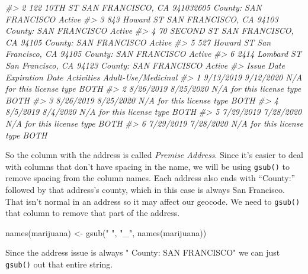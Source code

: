\documentclass[
  12pt,
]{book}
\newenvironment{Shaded}{\begin{snugshade}}{\end{snugshade}}
\newcommand{\CommentTok}[1]{\textcolor[rgb]{0.37,0.37,0.37}{\textit{#1}}}
\newcommand{\FunctionTok}[1]{\textcolor[rgb]{0,0,0}{#1}}
\newcommand{\NormalTok}[1]{#1}
\newcommand{\OtherTok}[1]{\textcolor[rgb]{0.37,0.37,0.37}{#1}}
\newcommand{\SpecialCharTok}[1]{\textcolor[rgb]{0,0,0}{#1}}
\newcommand{\StringTok}[1]{\textcolor[rgb]{0.5,0.5,0.5}{#1}}
\begin{document}
\begin{Shaded}
\begin{Highlighting}[]
\CommentTok{\#\textgreater{} 2 122 10TH ST SAN FRANCISCO, CA 941032605 County: SAN FRANCISCO Active}
\CommentTok{\#\textgreater{} 3   843 Howard ST SAN FRANCISCO, CA 94103 County: SAN FRANCISCO Active}
\CommentTok{\#\textgreater{} 4    70 SECOND ST SAN FRANCISCO, CA 94105 County: SAN FRANCISCO Active}
\CommentTok{\#\textgreater{} 5   527 Howard ST San Francisco, CA 94105 County: SAN FRANCISCO Active}
\CommentTok{\#\textgreater{} 6 2414 Lombard ST San Francisco, CA 94123 County: SAN FRANCISCO Active}
\CommentTok{\#\textgreater{}   Issue Date Expiration Date                Activities Adult{-}Use/Medicinal}
\CommentTok{\#\textgreater{} 1  9/13/2019       9/12/2020 N/A for this license type                BOTH}
\CommentTok{\#\textgreater{} 2  8/26/2019       8/25/2020 N/A for this license type                BOTH}
\CommentTok{\#\textgreater{} 3  8/26/2019       8/25/2020 N/A for this license type                BOTH}
\CommentTok{\#\textgreater{} 4   8/5/2019        8/4/2020 N/A for this license type                BOTH}
\CommentTok{\#\textgreater{} 5  7/29/2019       7/28/2020 N/A for this license type                BOTH}
\CommentTok{\#\textgreater{} 6  7/29/2019       7/28/2020 N/A for this license type                BOTH}
\end{Highlighting}
\end{Shaded}

So the column with the address is called \emph{Premise Address}. Since it's easier to deal with columns that don't have spacing in the name, we will be using \texttt{gsub()} to remove spacing from the column names. Each address also ends with ``County:'' followed by that address's county, which in this case is always San Francisco. That isn't normal in an address so it may affect our geocode. We need to \texttt{gsub()} that column to remove that part of the address.

\begin{Shaded}
\begin{Highlighting}[]
\FunctionTok{names}\NormalTok{(marijuana) }\OtherTok{\textless{}{-}} \FunctionTok{gsub}\NormalTok{(}\StringTok{" "}\NormalTok{, }\StringTok{"\_"}\NormalTok{, }\FunctionTok{names}\NormalTok{(marijuana))}
\end{Highlighting}
\end{Shaded}

Since the address issue is always " County: SAN FRANCISCO" we can just \texttt{gsub()} out that entire string.

\begin{Shaded}
\end{Shaded}
\end{document}
